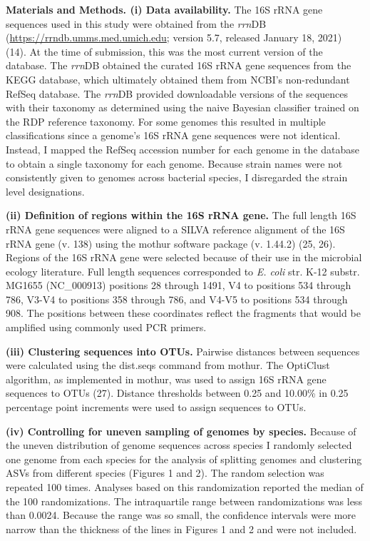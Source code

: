 \documentclass[
]{article}
\begin{document}
\textbf{Materials and Methods. (i) Data availability.} The 16S rRNA gene
sequences used in this study were obtained from the \emph{rrn}DB
(\url{https://rrndb.umms.med.umich.edu}; version 5.7, released January
18, 2021) (14). At the time of submission, this was the most current
version of the database. The \emph{rrn}DB obtained the curated 16S rRNA
gene sequences from the KEGG database, which ultimately obtained them
from NCBI's non-redundant RefSeq database. The \emph{rrn}DB provided
downloadable versions of the sequences with their taxonomy as determined
using the naive Bayesian classifier trained on the RDP reference
taxonomy. For some genomes this resulted in multiple classifications
since a genome's 16S rRNA gene sequences were not identical. Instead, I
mapped the RefSeq accession number for each genome in the database to
obtain a single taxonomy for each genome. Because strain names were not
consistently given to genomes across bacterial species, I disregarded
the strain level designations.

\textbf{(ii) Definition of regions within the 16S rRNA gene.} The full
length 16S rRNA gene sequences were aligned to a SILVA reference
alignment of the 16S rRNA gene (v. 138) using the mothur software
package (v. 1.44.2) (25, 26). Regions of the 16S rRNA gene were selected
because of their use in the microbial ecology literature. Full length
sequences corresponded to \emph{E. coli} str. K-12 substr. MG1655
(NC\_000913) positions 28 through 1491, V4 to positions 534 through 786,
V3-V4 to positions 358 through 786, and V4-V5 to positions 534 through
908. The positions between these coordinates reflect the fragments that
would be amplified using commonly used PCR primers.

\textbf{(iii) Clustering sequences into OTUs.} Pairwise distances
between sequences were calculated using the dist.seqs command from
mothur. The OptiClust algorithm, as implemented in mothur, was used to
assign 16S rRNA gene sequences to OTUs (27). Distance thresholds between
0.25 and 10.00\% in 0.25 percentage point increments were used to assign
sequences to OTUs.

\textbf{(iv) Controlling for uneven sampling of genomes by species.}
Because of the uneven distribution of genome sequences across species I
randomly selected one genome from each species for the analysis of
splitting genomes and clustering ASVs from different species (Figures 1
and 2). The random selection was repeated 100 times. Analyses based on
this randomization reported the median of the 100 randomizations. The
intraquartile range between randomizations was less than 0.0024. Because
the range was so small, the confidence intervals were more narrow than
the thickness of the lines in Figures 1 and 2 and were not included.
\end{document}

